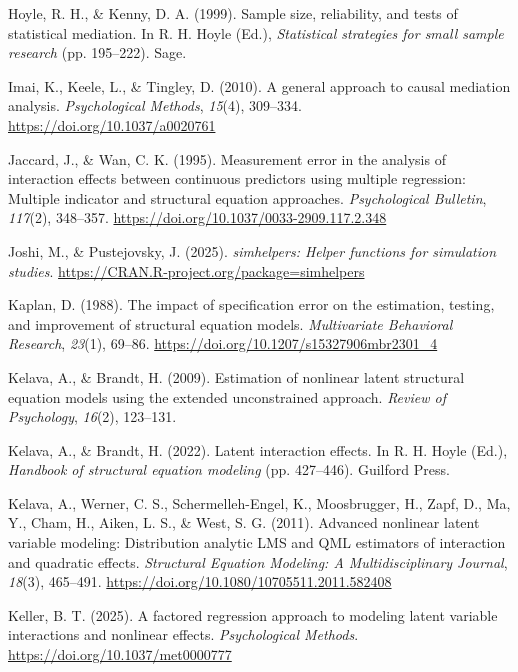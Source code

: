 \documentclass[
  man,
  longtable,
  nolmodern,
  notxfonts,
  notimes,
  colorlinks=true,linkcolor=blue,citecolor=blue,urlcolor=blue]{apa7}
\newlength{\cslhangindent}
\newenvironment{CSLReferences}[2] %
 {\begin{list}{}{%
  \setlength{\itemindent}{0pt}
  \setlength{\leftmargin}{0pt}
  \setlength{\parsep}{0pt}
  \ifodd #1
   \setlength{\leftmargin}{\cslhangindent}
   \setlength{\itemindent}{-1\cslhangindent}
  \fi
  \setlength{\itemsep}{#2\baselineskip}}}
 {\end{list}}
\begin{document}
\begin{CSLReferences}{1}{0}
Hoyle, R. H., \& Kenny, D. A. (1999). Sample size, reliability, and
tests of statistical mediation. In R. H. Hoyle (Ed.), \emph{Statistical
strategies for small sample research} (pp. 195--222). Sage.

Imai, K., Keele, L., \& Tingley, D. (2010). A general approach to causal
mediation analysis. \emph{Psychological Methods}, \emph{15}(4),
309--334. \url{https://doi.org/10.1037/a0020761}

Jaccard, J., \& Wan, C. K. (1995). Measurement error in the analysis of
interaction effects between continuous predictors using multiple
regression: Multiple indicator and structural equation approaches.
\emph{Psychological Bulletin}, \emph{117}(2), 348--357.
\url{https://doi.org/10.1037/0033-2909.117.2.348}

Joshi, M., \& Pustejovsky, J. (2025). \emph{{simhelpers}: Helper
functions for simulation studies}.
\url{https://CRAN.R-project.org/package=simhelpers}

Kaplan, D. (1988). The impact of specification error on the estimation,
testing, and improvement of structural equation models.
\emph{Multivariate Behavioral Research}, \emph{23}(1), 69--86.
\url{https://doi.org/10.1207/s15327906mbr2301_4}

Kelava, A., \& Brandt, H. (2009). Estimation of nonlinear latent
structural equation models using the extended unconstrained approach.
\emph{Review of Psychology}, \emph{16}(2), 123--131.

Kelava, A., \& Brandt, H. (2022). Latent interaction effects. In R. H.
Hoyle (Ed.), \emph{Handbook of structural equation modeling} (pp.
427--446). Guilford Press.

Kelava, A., Werner, C. S., Schermelleh-Engel, K., Moosbrugger, H., Zapf,
D., Ma, Y., Cham, H., Aiken, L. S., \& West, S. G. (2011). Advanced
nonlinear latent variable modeling: Distribution analytic {LMS} and
{QML} estimators of interaction and quadratic effects. \emph{Structural
Equation Modeling: A Multidisciplinary Journal}, \emph{18}(3), 465--491.
\url{https://doi.org/10.1080/10705511.2011.582408}

Keller, B. T. (2025). A factored regression approach to modeling latent
variable interactions and nonlinear effects. \emph{Psychological
Methods}. \url{https://doi.org/10.1037/met0000777}


\end{CSLReferences}
\end{document}

